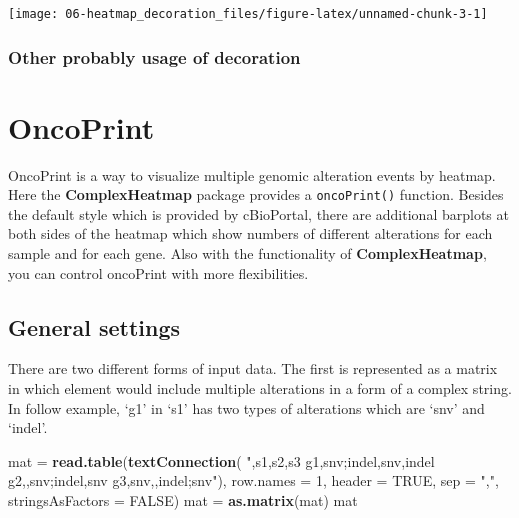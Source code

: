 \documentclass[]{book}
\newenvironment{Shaded}{\begin{snugshade}}{\end{snugshade}}
\newcommand{\KeywordTok}[1]{\textcolor[rgb]{0.13,0.29,0.53}{\textbf{#1}}}
\newcommand{\DataTypeTok}[1]{\textcolor[rgb]{0.13,0.29,0.53}{#1}}
\newcommand{\DecValTok}[1]{\textcolor[rgb]{0.00,0.00,0.81}{#1}}
\newcommand{\StringTok}[1]{\textcolor[rgb]{0.31,0.60,0.02}{#1}}
\newcommand{\OtherTok}[1]{\textcolor[rgb]{0.56,0.35,0.01}{#1}}
\newcommand{\NormalTok}[1]{#1}
\theoremstyle{definition}
\theoremstyle{definition}
\theoremstyle{definition}
\theoremstyle{remark}
\begin{document}
\begin{center}\texttt{[image: 06-heatmap\_decoration\_files/figure-latex/unnamed-chunk-3-1]} \end{center}

\subsection{Other probably usage of
decoration}\label{other-probably-usage-of-decoration}

\chapter{OncoPrint}\label{oncoprint}

OncoPrint is a way to visualize multiple genomic alteration events by
heatmap. Here the \textbf{ComplexHeatmap} package provides a
\texttt{oncoPrint()} function. Besides the default style which is
provided by cBioPortal, there are additional barplots at both sides of
the heatmap which show numbers of different alterations for each sample
and for each gene. Also with the functionality of
\textbf{ComplexHeatmap}, you can control oncoPrint with more
flexibilities.

\section{General settings}\label{general-settings}

There are two different forms of input data. The first is represented as
a matrix in which element would include multiple alterations in a form
of a complex string. In follow example, `g1' in `s1' has two types of
alterations which are `snv' and `indel'.

\begin{Shaded}
\begin{Highlighting}[]
\NormalTok{mat =}\StringTok{ }\KeywordTok{read.table}\NormalTok{(}\KeywordTok{textConnection}\NormalTok{(}
\StringTok{",s1,s2,s3}
\StringTok{g1,snv;indel,snv,indel}
\StringTok{g2,,snv;indel,snv}
\StringTok{g3,snv,,indel;snv"}\NormalTok{), }\DataTypeTok{row.names =} \DecValTok{1}\NormalTok{, }\DataTypeTok{header =} \OtherTok{TRUE}\NormalTok{, }\DataTypeTok{sep =} \StringTok{","}\NormalTok{, }\DataTypeTok{stringsAsFactors =} \OtherTok{FALSE}\NormalTok{)}
\NormalTok{mat =}\StringTok{ }\KeywordTok{as.matrix}\NormalTok{(mat)}
\NormalTok{mat}
\end{Highlighting}
\end{Shaded}
\end{document}
